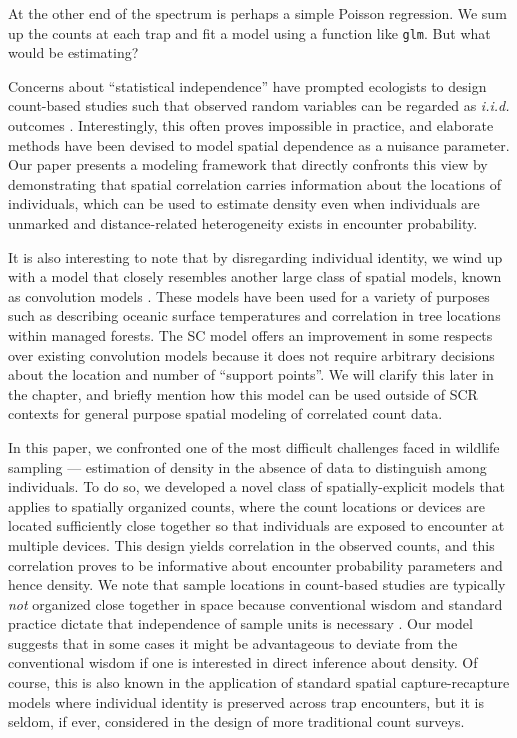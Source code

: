 At the other end of the spectrum is perhaps a simple Poisson
regression. We sum up the counts at each trap and fit a model using a
function like \verb+glm+. But what would be estimating?

Concerns about ``statistical independence'' have prompted
ecologists to design count-based studies such that observed
random variables can be regarded as {\it i.i.d.} outcomes
\citep{hurlbert:1984}. Interestingly, this
often proves impossible in practice, and elaborate
methods have been devised to model spatial dependence as a nuisance
parameter. Our paper presents a modeling framework that directly
confronts this view by demonstrating that spatial
correlation carries information about the locations of individuals,
which can be used to estimate density even when individuals
are unmarked and distance-related heterogeneity exists in encounter
probability.




It is also interesting to note that by disregarding individual
identity, we wind up with a model that closely resembles another large
class of spatial models, known as convolution models
\citep{wolpert_ickstadt:1998,higdon:1998}. These
models have been used for a variety of purposes such as describing oceanic
surface temperatures and correlation in tree locations within managed
forests. The SC model offers an improvement in
some respects over existing convolution models because it does not
require arbitrary decisions about the location and number of ``support
points''. We will clarify this later in the chapter, and briefly
mention how this model can be used outside of SCR contexts for general
purpose spatial modeling of correlated count data.


In this paper, we confronted one of the most difficult challenges
faced in wildlife sampling ---
estimation of density in the absence of data to distinguish among
individuals. To do so, we developed a novel class of
spatially-explicit models that
applies to spatially organized counts, where the count locations or
devices are located sufficiently close together so that individuals
are exposed to encounter at multiple devices. This design yields
correlation in the observed counts, and this correlation proves to be
informative about encounter probability parameters and hence density.
We note that sample locations in count-based studies are typically
{\it not} organized close
together in space because conventional wisdom and standard practice
dictate that independence of sample units is necessary
\citep{hurlbert:1984}. Our model
suggests that in some cases it might be advantageous to deviate from
the conventional wisdom if one is interested in direct inference about
density. Of course, this is also known in the application of standard spatial
capture-recapture  models \citep{borchers_efford:2008}
where individual
identity is preserved across trap encounters, but it is seldom, if
ever, considered in the design of more traditional count surveys.

